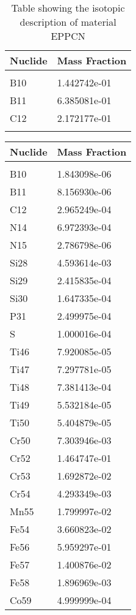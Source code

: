 \begin{centering}
\begin{longtable}[ht!]
\caption{Table showing the isotopic description of material Cryopump}
\label{table:material_Cryopump}
\end{longtable}\clearpage

\begin{longtable}[ht!]
{ p{} | p{} }
\hline
Nuclide & Mass Fraction\\
\hline
\\
B10 & 1.442742e-01\\
B11 & 6.385081e-01\\
C12 & 2.172177e-01\\

\caption{Table showing the isotopic description of material EPPCN}
\label{table:material_EPPCN}
\end{longtable}\clearpage

\begin{longtable}[ht!]
{ p{} | p{} }
\hline
Nuclide & Mass Fraction\\
\hline
\\
B10 & 1.843098e-06\\
B11 & 8.156930e-06\\
C12 & 2.965249e-04\\
N14 & 6.972393e-04\\
N15 & 2.786798e-06\\
Si28 & 4.593614e-03\\
Si29 & 2.415835e-04\\
Si30 & 1.647335e-04\\
P31 & 2.499975e-04\\
S & 1.000016e-04\\
Ti46 & 7.920085e-05\\
Ti47 & 7.297781e-05\\
Ti48 & 7.381413e-04\\
Ti49 & 5.532184e-05\\
Ti50 & 5.404879e-05\\
Cr50 & 7.303946e-03\\
Cr52 & 1.464747e-01\\
Cr53 & 1.692872e-02\\
Cr54 & 4.293349e-03\\
Mn55 & 1.799997e-02\\
Fe54 & 3.660823e-02\\
Fe56 & 5.959297e-01\\
Fe57 & 1.400876e-02\\
Fe58 & 1.896969e-03\\
Co59 & 4.999999e-04\\

\end{longtable}
\end{centering}

